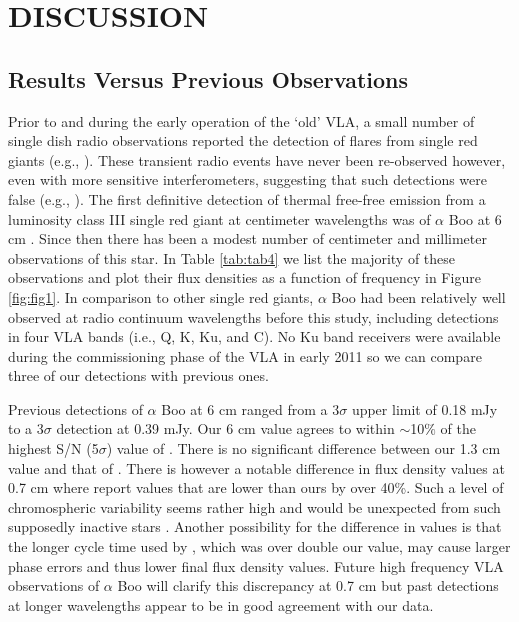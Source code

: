 \documentclass[iop]{emulateapj}
\begin{document}
\section{DISCUSSION}
\subsection{Results Versus Previous Observations} \label{disc1}
Prior to and during the early operation of the `old' VLA, a small number of single dish radio observations reported the detection of flares from single red giants (e.g., \citealt{1981ApJ...245L..71B}). These transient radio events have never been re-observed however, even with more sensitive interferometers, suggesting that such detections were false (e.g., \citealt{1992MNRAS.254....1B}). The first definitive detection of thermal free-free emission from a luminosity class III single red giant at centimeter wavelengths was of $\alpha$ Boo at 6 cm \citep{1983ApJ...274L..77D,1986AJ.....91..602D}. Since then there has been a modest number of centimeter and millimeter observations of this star. In Table \ref{tab:tab4} we list the majority of these observations and plot their flux densities as a function of frequency in Figure \ref{fig:fig1}. In comparison to other single red giants, $\alpha$ Boo had been relatively well observed at radio continuum wavelengths before this study, including detections in four VLA bands (i.e., Q, K, Ku, and C). No Ku band receivers were available during the commissioning phase of the VLA in early 2011 so we can compare three of our detections with previous ones. 

Previous detections of $\alpha$ Boo at 6 cm ranged from a 3$\sigma$ upper limit of 0.18 mJy to a 3$\sigma$ detection at 0.39 mJy. Our 6 cm value agrees to within $\sim$10$\%$ of the highest S/N (5$\sigma$) value of \cite{1986AJ.....91..602D}. There is no significant difference between our 1.3 cm value and that of \cite{2011AA...533A.107D}. There is however a notable difference in flux density values at 0.7 cm  where \cite{2011AA...533A.107D} report values that are lower than ours by over 40\%. Such a level of chromospheric variability seems rather high and would be unexpected from such supposedly inactive stars \citep{2013MNRAS.428.2064H}. Another possibility for the difference in values is that the longer cycle time used by \cite{2011AA...533A.107D}, which was over double our value, may cause larger phase errors and thus lower final flux density values. Future high frequency VLA observations of $\alpha$ Boo will clarify this discrepancy at 0.7 cm but past detections at longer wavelengths appear to be in good agreement with our data.
\end{document}
